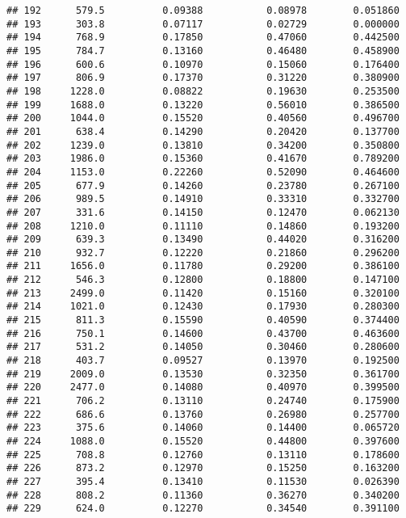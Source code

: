\documentclass[
]{article}
\begin{document}
\begin{verbatim}
## 192      579.5          0.09388           0.08978        0.051860
## 193      303.8          0.07117           0.02729        0.000000
## 194      768.9          0.17850           0.47060        0.442500
## 195      784.7          0.13160           0.46480        0.458900
## 196      600.6          0.10970           0.15060        0.176400
## 197      806.9          0.17370           0.31220        0.380900
## 198     1228.0          0.08822           0.19630        0.253500
## 199     1688.0          0.13220           0.56010        0.386500
## 200     1044.0          0.15520           0.40560        0.496700
## 201      638.4          0.14290           0.20420        0.137700
## 202     1239.0          0.13810           0.34200        0.350800
## 203     1986.0          0.15360           0.41670        0.789200
## 204     1153.0          0.22260           0.52090        0.464600
## 205      677.9          0.14260           0.23780        0.267100
## 206      989.5          0.14910           0.33310        0.332700
## 207      331.6          0.14150           0.12470        0.062130
## 208     1210.0          0.11110           0.14860        0.193200
## 209      639.3          0.13490           0.44020        0.316200
## 210      932.7          0.12220           0.21860        0.296200
## 211     1656.0          0.11780           0.29200        0.386100
## 212      546.3          0.12800           0.18800        0.147100
## 213     2499.0          0.11420           0.15160        0.320100
## 214     1021.0          0.12430           0.17930        0.280300
## 215      811.3          0.15590           0.40590        0.374400
## 216      750.1          0.14600           0.43700        0.463600
## 217      531.2          0.14050           0.30460        0.280600
## 218      403.7          0.09527           0.13970        0.192500
## 219     2009.0          0.13530           0.32350        0.361700
## 220     2477.0          0.14080           0.40970        0.399500
## 221      706.2          0.13110           0.24740        0.175900
## 222      686.6          0.13760           0.26980        0.257700
## 223      375.6          0.14060           0.14400        0.065720
## 224     1088.0          0.15520           0.44800        0.397600
## 225      708.8          0.12760           0.13110        0.178600
## 226      873.2          0.12970           0.15250        0.163200
## 227      395.4          0.13410           0.11530        0.026390
## 228      808.2          0.11360           0.36270        0.340200
## 229      624.0          0.12270           0.34540        0.391100

\end{verbatim}
\end{document}
